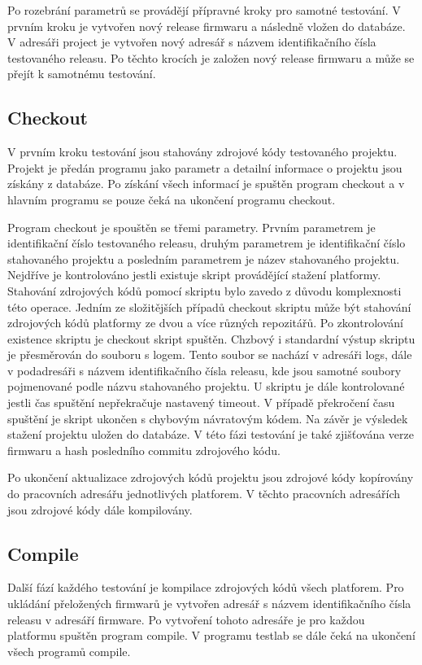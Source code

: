 Po rozebrání parametrů se provádějí přípravné kroky pro samotné testování. V prvním kroku je vytvořen nový release firmwaru a následně vložen do databáze. V adresáři project je vytvořen nový adresář s názvem identifikačního čísla testovaného releasu. Po těchto krocích je založen nový release firmwaru a může se přejít k samotnému testování.

\subsection{Checkout}
V prvním kroku testování jsou stahovány zdrojové kódy testovaného projektu. Projekt je předán programu jako parametr a detailní informace o projektu jsou získány z databáze. Po získání všech informací je spuštěn program checkout  a v hlavním programu se pouze čeká na ukončení programu checkout.

Program checkout je spouštěn se třemi parametry. Prvním parametrem je identifikační číslo testovaného releasu, druhým parametrem je identifikační číslo stahovaného projektu a posledním parametrem je název stahovaného projektu. Nejdříve je kontrolováno jestli existuje skript provádějící stažení platformy. Stahování zdrojových kódů pomocí skriptu bylo zavedo z důvodu komplexnosti této operace. Jedním ze složitějších případů checkout skriptu může být stahování zdrojových kódů platformy ze dvou a více různých repozitářů. Po zkontrolování existence skriptu je checkout skript spuštěn. Chzbový i standardní výstup skriptu je přesměrován do souboru s logem. Tento soubor se nachází v adresáři logs, dále v podadresáři s názvem identifikačního čísla releasu, kde jsou samotné soubory pojmenované podle názvu stahovaného projektu. U skriptu je dále kontrolované jestli čas spuštění nepřekračuje nastavený timeout. V případě překročení času spuštění je skript ukončen s chybovým návratovým kódem. Na závěr je výsledek stažení projektu uložen do databáze. V této fázi testování je také zjišťována verze firmwaru a hash posledního commitu zdrojového kódu.

Po ukončení aktualizace zdrojových kódů projektu jsou zdrojové kódy kopírovány do pracovních adresářu jednotlivých platforem. V těchto pracovních adresářích jsou zdrojové kódy dále kompilovány.

\subsection{Compile}
Další fází každého testování je kompilace zdrojových kódů všech platforem. Pro ukládání přeložených firmwarů je vytvořen adresář s názvem identifikačního čísla releasu v adresáří firmware. Po vytvoření tohoto adresáře je pro každou platformu spuštěn program compile. V programu testlab se dále čeká na ukončení všech programů compile.

